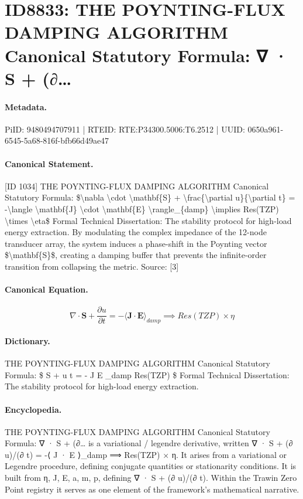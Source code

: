 \section*{ID8833: THE POYNTING-FLUX DAMPING ALGORITHM Canonical Statutory Formula: ∇ · S + (∂…}
\paragraph{Metadata.}
PiID: 9480494707911 | RTEID: RTE:P34300.5006:T6.2512 | UUID: 0650a961-6545-5a68-816f-bfb66d49ae47

\paragraph{Canonical Statement.}
[ID 1034] THE POYNTING-FLUX DAMPING ALGORITHM Canonical Statutory Formula: \$\textbackslash{}nabla \textbackslash{}cdot \textbackslash{}mathbf\{S\} + \textbackslash{}frac\{\textbackslash{}partial u\}\{\textbackslash{}partial t\} = -\textbackslash{}langle \textbackslash{}mathbf\{J\} \textbackslash{}cdot \textbackslash{}mathbf\{E\} \textbackslash{}rangle\_\{damp\} \textbackslash{}implies Res(TZP) \textbackslash{}times \textbackslash{}eta\$ Formal Technical Dissertation: The stability protocol for high-load energy extraction. By modulating the complex impedance of the 12-node transducer array, the system induces a phase-shift in the Poynting vector \$\textbackslash{}mathbf\{S\}\$, creating a damping buffer that prevents the infinite-order transition from collapsing the metric. Source: [3]

\paragraph{Canonical Equation.}
\[
\nabla \cdot \mathbf{S} + \frac{\partial u}{\partial t} = -\langle \mathbf{J} \cdot \mathbf{E} \rangle_{damp} \implies Res(TZP) \times \eta
\]

\paragraph{Dictionary.}
THE POYNTING-FLUX DAMPING ALGORITHM Canonical Statutory Formula: \$ S + u t = - J E \_damp Res(TZP) \$ Formal Technical Dissertation: The stability protocol for high-load energy extraction.

\paragraph{Encyclopedia.}
THE POYNTING-FLUX DAMPING ALGORITHM Canonical Statutory Formula: ∇ · S + (∂… is a variational / legendre derivative, written ∇ · S + (∂ u)/(∂ t) = -⟨ J · E ⟩\_damp ⟹ Res(TZP) × η. It arises from a variational or Legendre procedure, defining conjugate quantities or stationarity conditions. It is built from η, J, E, a, m, p, defining ∇ · S + (∂ u)/(∂ t). Within the Trawin Zero Point registry it serves as one element of the framework's mathematical narrative.
